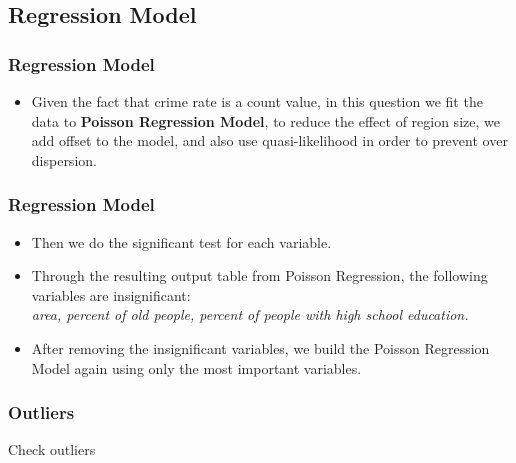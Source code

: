 \documentclass{beamer}
\begin{document}
\subsection{Regression Model}
\begin{frame}[fragile]
\frametitle{Regression Model}
\begin{itemize}
\item Given the fact that crime rate is a count value, in this question we fit the data to \textbf{Poisson Regression Model}, to reduce the effect of region size, we add offset to the model, and also use quasi-likelihood in order to prevent over dispersion.
\end{itemize}
\end{frame}


\begin{frame}[fragile]
\frametitle{Regression Model}
\begin{itemize}
\item Then we do the significant test for each variable.\\
\item Through the resulting output table from Poisson Regression, the following variables are insignificant:\\
\textsl{area, percent of old people, percent of people with high school education.}
\item After removing the insignificant variables, we build the Poisson Regression Model again using only the most important variables.
\end{itemize}
\end{frame}


\begin{frame}[fragile]
\frametitle{Outliers}
Check outliers
\begin{center}
\end{center}
\end{frame}
\end{document}
